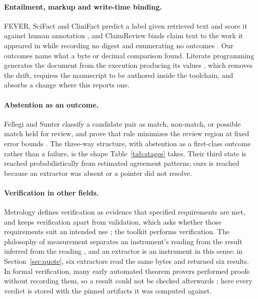 \documentclass{article}
\begin{document}
\paragraph{Entailment, markup and write-time binding.} FEVER, SciFact and CliniFact predict a
label given retrieved text and score it against human annotation
\citep{thorne2018fever,wadden2020scifact,clinifact2025}, and ClaimReview binds claim text to the
work it appeared in while recording no digest and enumerating no outcomes
\citep{schemaorg2026claimreview}. Our outcomes name what a byte or decimal comparison found.
Literate programming generates the document from the execution producing its values
\citep{leisch2002sweave}, which removes the drift, requires the manuscript to be authored inside
the toolchain, and absorbs a change where this reports one.

\paragraph{Abstention as an outcome.} Fellegi and Sunter classify a candidate pair as match,
non-match, or possible match held for review, and prove that rule minimizes the review region at
fixed error bounds \citep{fellegi1969linkage}. The three-way structure, with abstention as a
first-class outcome rather than a failure, is the shape Table~\ref{tab:stages} takes. Their third
state is reached probabilistically from estimated agreement patterns; ours is reached because an
extractor was absent or a pointer did not resolve.

\paragraph{Verification in other fields.} Metrology defines verification as evidence that specified
requirements are met, and keeps verification apart from validation, which asks whether those
requirements suit an intended use \citep{jcgm2012vim}; the toolkit performs verification. The
philosophy of measurement separates an instrument's reading from the result inferred from the
reading \citep{tal2017calibration}, and an extractor is an instrument in this sense: in
Section~\ref{sec:quote}, six extractors read the same bytes and returned six results. In formal
verification, many early automated theorem provers performed proofs without recording them, so a
result could not be checked afterwards \citep{mackenzie2001mechanizing}; here every verdict is
stored with the pinned artifacts it was computed against.
\end{document}
